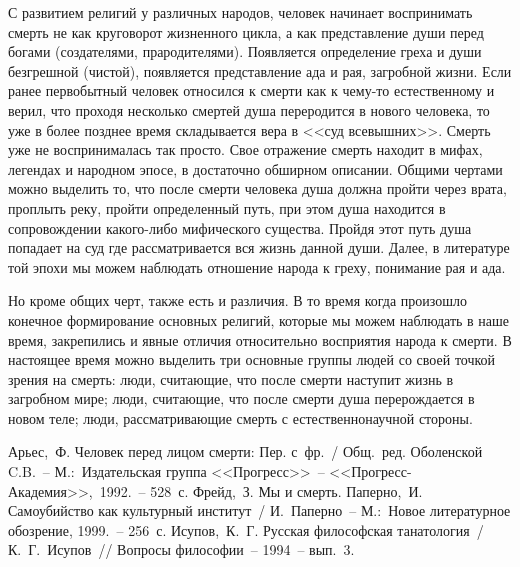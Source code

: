\documentclass[pscyr,titlepage,chapters]{hedreport}
\begin{document}
  С развитием религий у различных народов, человек начинает воспринимать смерть
  не как круговорот жизненного цикла, а как представление души перед богами
  (создателями, прародителями). Появляется определение греха и души безгрешной
  (чистой), появляется представление ада и рая, загробной жизни. Если ранее
  первобытный человек относился к смерти как к чему-то естественному и верил,
  что проходя несколько смертей душа переродится в нового человека, то уже в
  более позднее время складывается вера в <<суд всевышних>>. Смерть уже не
  воспринималась так просто. Свое отражение смерть находит в мифах, легендах и
  народном эпосе, в достаточно обширном описании. Общими чертами можно выделить
  то, что после смерти человека душа должна пройти через врата, проплыть реку,
  пройти определенный путь, при этом душа находится в сопровождении какого-либо
  мифического существа. Пройдя этот путь душа попадает на суд где
  рассматривается вся жизнь данной души. Далее, в литературе той эпохи мы можем
  наблюдать отношение народа к греху, понимание рая и ада.

  Но кроме общих черт, также есть и различия. В то время когда произошло
  конечное формирование основных религий, которые мы можем наблюдать в наше
  время, закрепились и явные отличия относительно восприятия народа к смерти. В
  настоящее время можно выделить три основные группы людей со своей точкой
  зрения на смерть: люди, считающие, что после смерти наступит жизнь в
  загробном мире; люди, считающие, что после смерти душа перерождается в
  новом теле; люди, рассматривающие смерть с естественнонаучной стороны.

  \pagebreak

  \renewcommand{\bibname}{Список литературы}
  \begin{thebibliography}{9}
     Арьес,~Ф. Человек перед лицом смерти: Пер. с~фр.~/ Общ.~ред.
      Оболенской C.B.~-- М.:~Издательская группа <<Прогресс>>~--
      <<Прогресс-Академия>>,~1992.~-- 528~с.
     Фрейд,~З. Мы и смерть.
     Паперно,~И. Самоубийство как культурный институт~/ И.~Паперно~--
      М.:~Новое литературное обозрение, 1999.~-- 256~с.
     Исупов,~К.~Г. Русская философская танатология~/ К.~Г.~Исупов~//
      Вопросы философии~-- 1994~-- вып.~3.
  \end{thebibliography}
\end{document}
